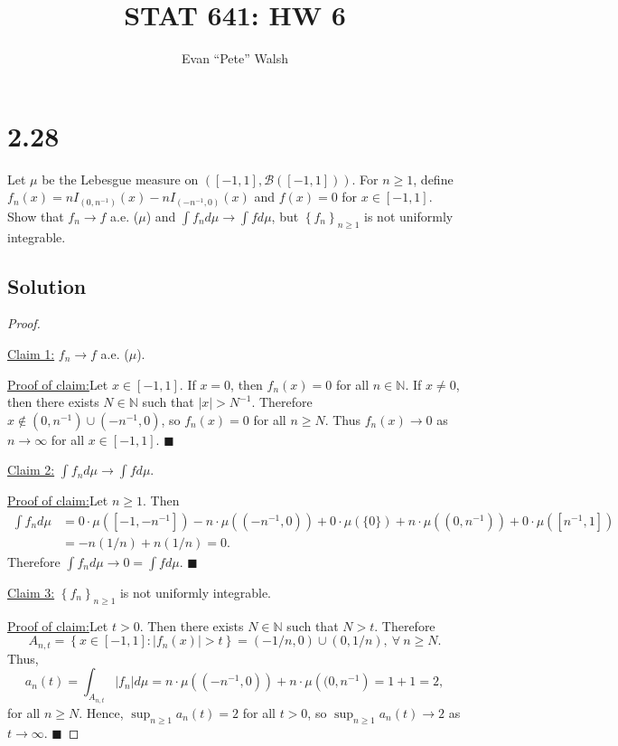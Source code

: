\documentclass[12pt]{article}
\title{STAT 641: HW 6}
\author{Evan ``Pete'' Walsh}
\newenvironment{claimproof}[1]{\par\noindent\underline{Proof of claim:}\space#1}{\hfill $\blacksquare$\vspace{3mm}}
\begin{document}
\maketitle

\section*{2.28}
Let $\mu$ be the Lebesgue measure on $\left( [-1,1], \mathcal{B}([-1,1]) \right)$. For $n \geq 1$, define $f_{n}(x) = nI_{(0,n^{-1})}(x) -
nI_{(-n^{-1},0)}(x)$ and $f(x) = 0$ for $x \in [-1,1]$. Show that $f_{n} \rightarrow f$ a.e. ($\mu$) and $\int f_{n}d\mu \rightarrow \int fd\mu$, but
$\left\{ f_{n} \right\}_{n\geq 1}$ is not uniformly integrable.

\subsection*{Solution}
\begin{proof}
$\ $

\underline{Claim 1:} $f_{n} \rightarrow f$ a.e. ($\mu$).
\begin{claimproof}
Let $x \in [-1,1]$. If $x = 0$, then $f_{n}(x) = 0$ for all $n \in \mathbb{N}$. If $x \neq 0$, then there exists $N \in \mathbb{N}$ such that $|x| >
N^{-1}$. Therefore $x \notin (0,n^{-1}) \cup (-n^{-1},0)$, so $f_{n}(x) = 0$ for all $n \geq N$. Thus $f_{n}(x) \rightarrow 0$ as $n \rightarrow
\infty$ for all $x \in [-1,1]$.
\end{claimproof}

\underline{Claim 2:} $\int f_{n}d\mu \rightarrow \int fd\mu$.
\begin{claimproof}
Let $n \geq 1$. Then 
\begin{align*}
\int f_{n}d\mu & = 0\cdot \mu\left( [-1,-n^{-1}] \right) -n\cdot \mu\left( (-n^{-1},0) \right) + 0\cdot \mu\left( \{0\} \right) + 
n\cdot \mu\left( (0,n^{-1}) \right) + 0\cdot \mu\left( [n^{-1},1] \right) \\
& = -n(1/n) + n(1/n) = 0.
\end{align*}
Therefore $\int f_{n}d\mu \rightarrow 0 = \int fd\mu$.
\end{claimproof}

\underline{Claim 3:} $\left\{ f_{n} \right\}_{n\geq 1}$ is not uniformly integrable.
\begin{claimproof}
Let $t > 0$. Then there exists $N \in \mathbb{N}$ such that $N > t$. Therefore 
\[ A_{n,t} = \left\{ x \in [-1,1] : |f_{n}(x)| > t \right\} = (-1/n, 0) \cup (0, 1/n), \ \forall \ n \geq N. \]
Thus,
\[ a_{n}(t) = \int_{A_{n,t}} |f_{n}|d\mu = n\cdot \mu\left( (-n^{-1},0) \right) + n\cdot \mu\left( (0,n^{-1} \right) = 1 + 1 = 2, \]
for all $n \geq N$. Hence, $\sup_{n\geq 1}a_{n}(t) = 2$ for all $t > 0$, so $\sup_{n\geq 1}a_{n}(t) \rightarrow 2$ as $t\rightarrow \infty$.
\end{claimproof}

\vspace{-5mm}
\end{proof}
\end{document}
